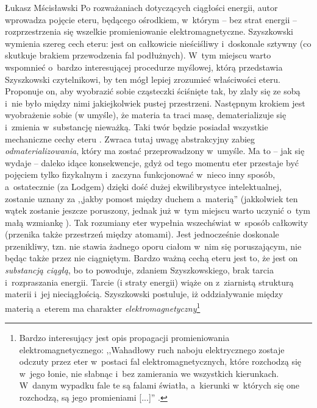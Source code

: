 \begin{artplenv}{Łukasz Mścisławski}
Po rozważaniach dotyczących ciągłości energii, autor wprowadza pojęcie eteru, będącego ośrodkiem, w~którym -- bez strat energii -- rozprzestrzenia się wszelkie promieniowanie elektromagnetyczne. Szyszkowski wymienia szereg cech eteru: jest on całkowicie nieściśliwy i~doskonale sztywny (co skutkuje brakiem przewodzenia fal podłużnych). W~tym miejscu warto wspomnieć o~bardzo interesującej procedurze myślowej, którą przedstawia Szyszkowski czytelnikowi, by ten mógł lepiej zrozumieć właściwości eteru. Proponuje on, aby wyobrazić sobie cząsteczki ściśnięte tak, by zlały się ze sobą i~nie było między nimi jakiejkolwiek pustej przestrzeni. Następnym krokiem jest wyobrażenie sobie (w umyśle), że materia ta traci masę, dematerializuje się i~zmienia w~substancję nieważką. Taki twór będzie posiadał wszystkie mechaniczne cechy eteru
\parencite[por.][s.~50]{szyszkowski_o_1916}. %
 Zwraca tutaj uwagę abstrakcyjny zabieg \textit{odmaterializowania}, który ma zostać przeprowadzony w~umyśle. Ma to -- jak się wydaje -- daleko idące konsekwencje, gdyż od tego momentu eter przestaje być pojęciem tylko fizykalnym i~zaczyna funkcjonować w~nieco inny sposób, a~ostatecznie (za Lodgem) dzięki dość dużej ekwilibrystyce intelektualnej, zostanie uznany za ,,jakby pomost między duchem a~materią'' (jakkolwiek ten wątek zostanie jeszcze poruszony, jednak już w~tym miejscu warto uczynić o~tym małą wzmiankę 
\parencite[por.][s.~55]{szyszkowski_o_1916}%
). Tak rozumiany eter wypełnia wszechświat w~sposób całkowity (przenika także przestrzeń między atomami). Jest jednocześnie doskonale przenikliwy, tzn. nie stawia żadnego oporu ciałom w~nim się poruszającym, nie będąc także przez nie ciągniętym. Bardzo ważną cechą eteru jest to, że jest on \textit{substancją ciągłą}, bo to powoduje, zdaniem Szyszkowskiego, brak tarcia i~rozpraszania energii. Tarcie (i straty energii) wiąże on z~ziarnistą strukturą materii i~jej nieciągłością. Szyszkowski postuluje, iż oddziaływanie między materią a~eterem ma charakter \textit{elektromagnetyczny}\footnote{Bardzo interesujący jest opis propagacji promieniowania elektromagnetycznego: ,,Wahadłowy ruch naboju elektrycznego zostaje odczuty przez eter w~postaci fal elektromagnetycznych, które rozchodzą się w~jego łonie, nie słabnąc i~bez zamierania we wszystkich kierunkach. W~danym wypadku fale te są falami światła, a~kierunki w~których się one rozchodzą, są jego promieniami [...]'' 
\parencite[][s.~51]{szyszkowski_o_1916}.%
}
\end{artplenv}
